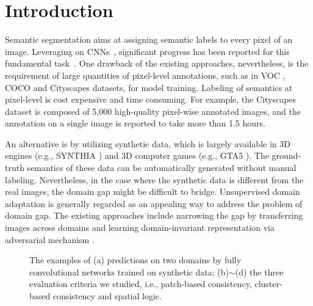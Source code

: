 \documentclass[10pt,twocolumn,letterpaper]{article}
\begin{document}
\section{Introduction}
\vspace{-0.05in}
Semantic segmentation aims at assigning semantic labels to every pixel of an image. Leveraging on CNNs~\cite{he2016deep,Hu_2018_CVPR,ILSVRC15,simonyan2014very,szegedy2015going}, significant progress has been reported for this fundamental task~\cite{chen2016deeplab,Chen_2018_ECCV,long2015fully,Peng_2017_CVPR}. One drawback of the existing approaches, nevertheless, is the requirement of large quantities of pixel-level annotations, such as in VOC \cite{everingham2010pascal}, COCO \cite{lin2014microsoft} and Cityscapes \cite{Cordts2016Cityscapes} datasets, for model training. Labeling of semantics at pixel-level is cost expensive and time consuming.
For example, the Cityscapes dataset is composed of 5,000 high-quality pixel-wise annotated images, and the annotation on a single image is reported to take more than 1.5 hours.

An alternative is by utilizing synthetic data, which is largely available in 3D engines (e.g., SYNTHIA \cite{ros2016synthia}) and 3D computer games (e.g., GTA5 \cite{GTA5_richter2016playing}). The ground-truth semantics of these data can be automatically generated without manual labeling. Nevertheless, in the case where the synthetic data is different from the real images, the domain gap might be difficult to bridge. Unsupervised domain adaptation is generally regarded as an appealing way to address the problem of domain gap. The existing approaches include narrowing the gap by transferring images across domains \cite{dundar2018domain,murez2018image,wu2018dcan} and learning domain-invariant representation via adversarial mechanism \cite{Du_2019_ICCV,luo2019taking,Vu_2019_CVPR}.

\begin{figure*}[!tb]
\vspace{-0.05in}
   \vspace{-0.1in}
   \caption{\small The examples of (a) predictions on two domains by fully convolutional networks trained on synthetic data; (b)$\sim$(d) the three evaluation criteria we studied, i.e., patch-based consistency, cluster-based consistency and spatial logic.}
   \label{fig:intro}
   \vspace{-0.25in}
\end{figure*}
\end{document}
